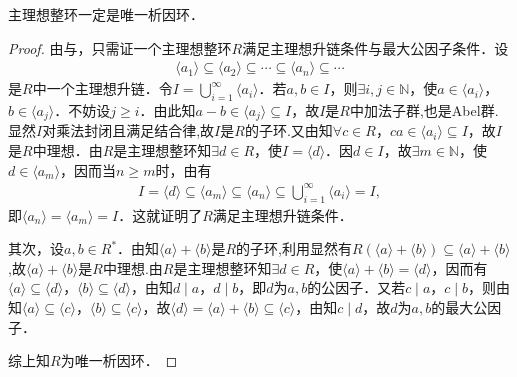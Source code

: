 \documentclass[../../main.tex]{subfiles}%
\begin{document}
\begin{theorem}\label{theorem:p.i.d必是UFD}
主理想整环一定是唯一析因环．
\end{theorem}
\begin{proof}
由与，只需证一个主理想整环$R$满足主理想升链条件与最大公因子条件．设
\begin{align*}
\langle a_1 \rangle \subseteq \langle a_2 \rangle \subseteq \cdots \subseteq \langle a_n \rangle \subseteq \cdots
\end{align*}
是$R$中一个主理想升链．令$I = \bigcup\limits_{i=1}^{\infty} \langle a_i \rangle$．若$a, b \in I$，则$\exists i, j \in \mathbb{N}$，使$a \in \langle a_i \rangle$，$b \in \langle a_j \rangle$．不妨设$j \geqslant i$．由此知$a - b \in \langle a_j \rangle \subseteq I$，故$I$是$R$中加法子群,也是Abel群.显然$I$对乘法封闭且满足结合律,故$I$是$R$的子环.又由知$\forall c \in R$，$ca \in \langle a_i \rangle \subseteq I$，故$I$是$R$中理想．由$R$是主理想整环知$\exists d \in R$，使$I = \langle d \rangle$．因$d \in I$，故$\exists m \in \mathbb{N}$，使$d \in \langle a_m \rangle$，因而当$n \geqslant m$时，由有
\begin{align*}
I = \langle d \rangle \subseteq \langle a_m \rangle \subseteq \langle a_n \rangle \subseteq \bigcup\limits_{i=1}^{\infty} \langle a_i \rangle = I,
\end{align*}
即$\langle a_n \rangle = \langle a_m \rangle = I$．这就证明了$R$满足主理想升链条件．

其次，设$a, b \in R^*$．由知$\langle a \rangle + \langle b \rangle$是$R$的子环,利用显然有$R(\langle a \rangle + \langle b \rangle)\subseteq \langle a \rangle + \langle b \rangle$,故$\langle a \rangle + \langle b \rangle$是$R$中理想.由$R$是主理想整环知$\exists d \in R$，使$\langle a \rangle + \langle b \rangle = \langle d \rangle$，因而有$\langle a \rangle \subseteq \langle d \rangle$，$\langle b \rangle \subseteq \langle d \rangle$，由知$d \mid a$，$d \mid b$，即$d$为$a, b$的公因子．又若$c \mid a$，$c \mid b$，则由知$\langle a \rangle \subseteq \langle c \rangle$，$\langle b \rangle \subseteq \langle c \rangle$，故$\langle d \rangle = \langle a \rangle + \langle b \rangle \subseteq \langle c \rangle$，由知$c \mid d$，故$d$为$a, b$的最大公因子．

综上知$R$为唯一析因环．
\end{proof}
\end{document}
